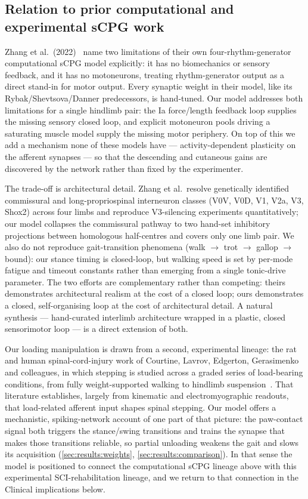 \subsection{Relation to prior computational and experimental sCPG work}
Zhang et al.\ (2022)~\cite{zhang2022} name two limitations of their own
four-rhythm-generator computational sCPG model explicitly: it has no
biomechanics or sensory feedback, and it has no motoneurons, treating
rhythm-generator output as a direct stand-in for motor output. Every
synaptic weight in their model, like its Rybak/Shevtsova/Danner
predecessors, is hand-tuned. Our model addresses both limitations for a
single hindlimb pair: the Ia force/length feedback loop supplies the
missing sensory closed loop, and explicit motoneuron pools driving a
saturating muscle model supply the missing motor periphery. On top of this
we add a mechanism none of these models have --- activity-dependent
plasticity on the afferent synapses --- so that the descending and
cutaneous gains are discovered by the network rather than fixed by the
experimenter.

The trade-off is architectural detail. Zhang et al.\ resolve genetically
identified commissural and long-propriospinal interneuron classes (V0V,
V0D, V1, V2a, V3, Shox2) across four limbs and reproduce V3-silencing
experiments quantitatively; our model collapses the commissural pathway to
two hand-set inhibitory projections between homologous half-centres and
covers only one limb pair. We also do not reproduce gait-transition
phenomena (walk $\to$ trot $\to$ gallop $\to$ bound): our stance timing is
closed-loop, but walking speed is set by per-mode fatigue and timeout constants
rather than emerging from a single tonic-drive parameter.
The two efforts are complementary rather than competing: theirs
demonstrates architectural realism at the cost of a closed loop; ours
demonstrates a closed, self-organising loop at the cost of architectural
detail. A natural synthesis --- hand-curated interlimb architecture wrapped
in a plastic, closed sensorimotor loop --- is a direct extension of both.

Our loading manipulation is drawn from a second, experimental lineage: the
rat and human spinal-cord-injury work of Courtine, Lavrov, Edgerton,
Gerasimenko and colleagues, in which stepping is studied across a graded
series of load-bearing conditions, from fully weight-supported walking to
hindlimb suspension~\cite{lavrov2008,edgerton2008,courtine2009,harkema2011}.
That literature establishes, largely from kinematic and electromyographic
readouts, that load-related afferent input shapes spinal stepping. Our model
offers a mechanistic, spiking-network account of one part of that picture: the
paw-contact signal both triggers the stance/swing transitions and trains the
synapse that makes those transitions reliable, so partial unloading weakens
the gait and slows its acquisition (\autoref{sec:results:weights},
\autoref{sec:results:comparison}). In that sense the model is positioned to
connect the computational sCPG lineage above with this experimental
SCI-rehabilitation lineage, and we return to that connection in the Clinical
implications below.

